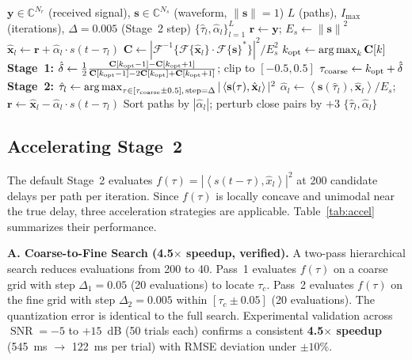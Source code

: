 \documentclass[a4paper,fleqn]{cas-dc}
\DeclareMathOperator*{\argmax}{arg\,max}
\DeclareMathOperator{\SNR}{SNR}
\newcommand{\Fc}{\mathcal{F}}
\newcommand{\Cc}{\mathbb{C}}
\newcommand{\norm}[1]{\left\lVert #1 \right\rVert}
\newcommand{\inner}[2]{\left\langle #1, #2 \right\rangle}
\newcommand{\hb}[1]{\hat{#1}}
\begin{document}
\begin{algorithm}[t]
\caption{Two-Stage CD-SAGE}
\label{alg:sage}
\begin{algorithmic}[1]
\Require $\mathbf{y} \in \Cc^{N_r}$ (received signal), $\mathbf{s} \in \Cc^{N_s}$ (waveform, $\norm{\mathbf{s}}=1$)
\Require $L$ (paths), $I_{\max}$ (iterations), $\Delta=0.005$ (Stage~2 step)
\Ensure $\{\hat{\tau}_l, \hat{\alpha}_l\}_{l=1}^{L}$
\State $\mathbf{r} \gets \mathbf{y}$; $E_s \gets \norm{\mathbf{s}}^2$
    \State $\hat{\mathbf{x}}_l \gets \mathbf{r} + \hat{\alpha}_l \cdot s(t-\hat{\tau}_l)$ 
    \State $\mathbf{C} \gets |\Fc^{-1}\{\Fc\{\hat{\mathbf{x}}_l\} \cdot \Fc\{\mathbf{s}\}^*\}|^2 / E_s^2$ 
    \State $k_{\rm opt} \gets \argmax_{k} \mathbf{C}[k]$ 
    \State \textbf{Stage~1:} $\hat{\delta} \gets \frac{1}{2}\frac{\mathbf{C}[k_{\rm opt}-1] - \mathbf{C}[k_{\rm opt}+1]}{\mathbf{C}[k_{\rm opt}-1] - 2\mathbf{C}[k_{\rm opt}] + \mathbf{C}[k_{\rm opt}+1]}$; clip to $[-0.5,0.5]$
    \State $\tau_{\rm coarse} \gets k_{\rm opt} + \hat{\delta}$
    \State \textbf{Stage~2:} $\hat{\tau}_l \gets \argmax_{\tau \in [\tau_{\rm coarse}\pm0.5],\, \text{step}=\Delta} |\inner{\mathbf{s}(\tau)}{\hat{\mathbf{x}}_l}|^2$
    \State $\hat{\alpha}_l \gets \inner{\mathbf{s}(\hat{\tau}_l)}{\hat{\mathbf{x}}_l} / E_s$; $\mathbf{r} \gets \hat{\mathbf{x}}_l - \hat{\alpha}_l \cdot s(t-\hat{\tau}_l)$
  \EndFor
   \State Sort paths by $|\hat{\alpha}_l|$; perturb close pairs by $+3$ \EndIf
\EndFor
\State \Return $\{\hat{\tau}_l, \hat{\alpha}_l\}$
\end{algorithmic}
\end{algorithm}

\subsection{Accelerating Stage~2}
\label{sec:accelerate}

The default Stage~2 evaluates $f(\tau) = |\inner{s(t-\tau)}{\hb{x}_l}|^2$ at 200 candidate delays per path per iteration. Since $f(\tau)$ is locally concave and unimodal near the true delay, three acceleration strategies are applicable. Table~\ref{tab:accel} summarizes their performance.

\textbf{A. Coarse-to-Fine Search (4.5$\times$ speedup, verified).} A two-pass hierarchical search reduces evaluations from 200 to 40. Pass~1 evaluates $f(\tau)$ on a coarse grid with step $\Delta_1 = 0.05$ (20 evaluations) to locate $\tau_c$. Pass~2 evaluates $f(\tau)$ on the fine grid with step $\Delta_2 = 0.005$ within $[\tau_c \pm 0.05]$ (20 evaluations). The quantization error is identical to the full search. Experimental validation across $\SNR = -5$ to $+15$~dB (50 trials each) confirms a consistent \textbf{4.5$\times$ speedup} (\SI{545}{ms} $\to$ \SI{122}{ms} per trial) with RMSE deviation under $\pm 10\%$.
\end{document}
